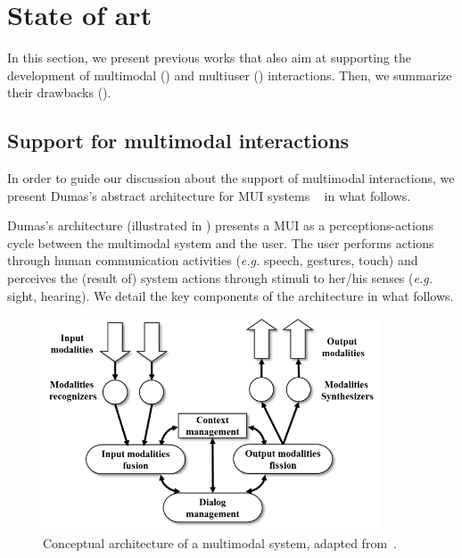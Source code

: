 \chapter{State of art}
\label{chp:state}

In this section, we present previous works that also aim at
supporting the development of multimodal () and
multiuser () interactions. Then, we summarize their
drawbacks ().

\section{Support for multimodal interactions}
\label{sec:state:multimodal}

In order to guide our discussion about the support of multimodal interactions,
we present Dumas’s abstract architecture for MUI systems
~\cite{dumas_multimodal_2009} in what follows.

Dumas’s architecture (illustrated in ) presents a MUI as a
perceptions-actions cycle between the multimodal system and the user. The user
performs actions through human communication activities (\textit{e.g.} speech, gestures,
touch) and perceives the (result of) system actions through stimuli to her/his
senses (\textit{e.g.} sight, hearing). We detail the key components of the architecture in
what follows.

\begin{figure}[!ht]
\begin{center}
	\includegraphics[width=10cm, keepaspectratio]{img/img6.png}
	\caption[Conceptual architecture of a multimodal system]{Conceptual
	architecture of a multimodal system, adapted from~\cite{dumas_multimodal_2009}.}
	\label{fig:dulmas}
    \captionvspace
\end{center}
\end{figure}

